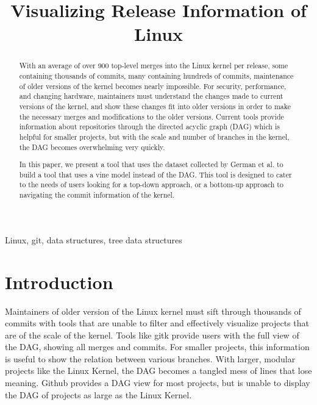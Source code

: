 \documentclass[conference, draftclsnofoot]{IEEEtran}
\makeatletter
\newcommand{\TheTitle}{Visualizing Release Information of Linux}
\newcommand{\TheAuthors}{Evan Wilde}
\newcommand{\TheEmails}{etcwilde@uvic.ca}
\newcommand{\TheKeywords}{Linux, git, data structures, tree data structures}
\makeatother
\begin{document}
\title{\TheTitle}
\author{
\IEEEauthorblockA{\TheAuthors}
\IEEEauthorblockA{Email: \TheEmails}
}
\maketitle
\begin{abstract}

	With an average of over 900 top-level merges into the Linux kernel per
	release, some containing thousands of commits, many containing hundreds
	of commits, maintenance of older versions of the kernel becomes nearly
	impossible. For security, performance, and changing hardware,
	maintainers must understand the changes made to current versions of the
	kernel, and show these changes fit into older versions in order to make
	the necessary merges and modifications to the older versions. Current
	tools provide information about repositories through the directed
	acyclic graph (DAG) which is helpful for smaller projects, but with the
	scale and number of branches in the kernel, the DAG becomes
	overwhelming very quickly.

	In this paper, we present a tool that uses the dataset collected by
	German et al. to build a tool that uses a vine model instead of the
	DAG. This tool is designed to cater to the needs of users looking for a
	top-down approach, or a bottom-up approach to navigating the commit
	information of the kernel.
\end{abstract}

\begin{IEEEkeywords}
\TheKeywords
\end{IEEEkeywords}

\section{Introduction}

Maintainers of older version of the Linux kernel must sift through thousands of
commits with tools that are unable to filter and effectively visualize projects
that are of the scale of the kernel. Tools like gitk provide users with the
full view of the DAG, showing all merges and commits. For smaller projects,
this information is useful to show the relation between various branches. With
larger, modular projects like the Linux Kernel, the DAG becomes a tangled mess
of lines that lose meaning. Github provides a DAG view for most projects, but is
unable to display the DAG of projects as large as the Linux Kernel.
\end{document}
